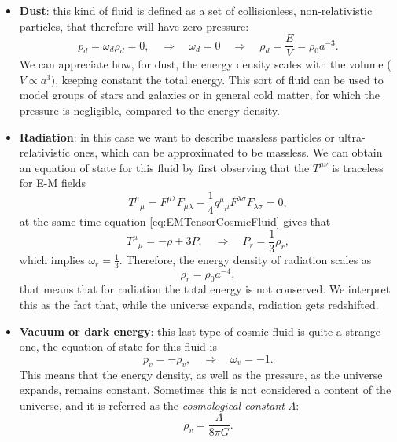 \begin{itemize}
    \item \textbf{Dust}: this kind of fluid is defined as a set of collisionless, non-relativistic particles, that therefore will have zero pressure:$$p_d=\omega_d\rho_d=0,\quad\Rightarrow\quad \omega_d=0\quad\Rightarrow\quad\rho_d=\frac{E}{V}=\rho_{0}a^{-3}.$$ We can appreciate how, for dust, the energy density scales with the volume ($V \propto  a^3$), keeping constant the total energy. This sort of fluid can be used to model groups of stars and galaxies or in general cold matter, for which the pressure is negligible, compared to the energy density.
    \item \textbf{Radiation}: in this case we want to describe massless particles or ultra-relativistic ones, which can be approximated to be massless. We can obtain an equation of state for this fluid by first observing that the $T^{\mu\nu}$ is traceless for E-M fields $$T^\mu\phantom{}_\mu=F^{\mu\lambda}F_{\mu\lambda}-\frac{1}{4}g^\mu\phantom{}_\mu F^{\lambda\sigma}F_{\lambda\sigma}=0,$$ at the same time equation \eqref{eq:EMTensorCosmicFluid} gives that $$T^\mu\phantom{}_\mu=-\rho+3P,\quad\Rightarrow\quad P_r=\frac{1}{3}\rho_r,$$ which implies $\omega_r=\frac{1}{3}$. Therefore, the energy density of radiation scales as$$\rho_r=\rho_0a^{-4},$$ that means that for radiation the total energy is not conserved. We interpret this as the fact that, while the universe expands, radiation gets redshifted.
    \item \textbf{Vacuum or dark energy}: this last type of cosmic fluid is quite a strange one, the equation of state for this fluid is $$p_v=-\rho_v,\quad \Rightarrow\quad \omega_v=-1.$$ This means that the energy density, as well as the pressure, as the universe expands, remains constant. Sometimes this is not considered a content of the universe, and it is referred as the \emph{cosmological constant} $\Lambda$: $$\rho_v=\frac{\Lambda}{8\pi G}.$$
\end{itemize}

